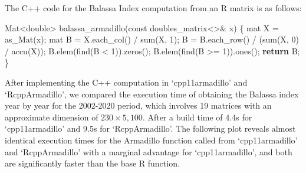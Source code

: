 \documentclass[
  10pt,
  letterpaper,
]{article}
\newenvironment{Shaded}{\begin{snugshade}}{\end{snugshade}}
\newcommand{\AttributeTok}[1]{\textcolor[rgb]{0.40,0.45,0.13}{#1}}
\newcommand{\ControlFlowTok}[1]{\textcolor[rgb]{0.00,0.23,0.31}{\textbf{#1}}}
\newcommand{\DataTypeTok}[1]{\textcolor[rgb]{0.68,0.00,0.00}{#1}}
\newcommand{\DecValTok}[1]{\textcolor[rgb]{0.68,0.00,0.00}{#1}}
\newcommand{\NormalTok}[1]{\textcolor[rgb]{0.00,0.23,0.31}{#1}}
\newcommand{\OperatorTok}[1]{\textcolor[rgb]{0.37,0.37,0.37}{#1}}
\begin{document}
The C++ code for the Balassa Index computation from an R matrix is as
follows:

\begin{Shaded}
\begin{Highlighting}[]
\NormalTok{Mat}\OperatorTok{\textless{}}\DataTypeTok{double}\OperatorTok{\textgreater{}}\NormalTok{ balassa\_armadillo}\OperatorTok{(}\AttributeTok{const}\NormalTok{ doubles\_matrix}\OperatorTok{\textless{}\textgreater{}\&}\NormalTok{ x}\OperatorTok{)} \OperatorTok{\{}
\NormalTok{  mat X }\OperatorTok{=}\NormalTok{ as\_Mat}\OperatorTok{(}\NormalTok{x}\OperatorTok{);}
\NormalTok{  mat B }\OperatorTok{=}\NormalTok{ X}\OperatorTok{.}\NormalTok{each\_col}\OperatorTok{()} \OperatorTok{/}\NormalTok{ sum}\OperatorTok{(}\NormalTok{X}\OperatorTok{,} \DecValTok{1}\OperatorTok{);}
\NormalTok{  B }\OperatorTok{=}\NormalTok{ B}\OperatorTok{.}\NormalTok{each\_row}\OperatorTok{()} \OperatorTok{/} \OperatorTok{(}\NormalTok{sum}\OperatorTok{(}\NormalTok{X}\OperatorTok{,} \DecValTok{0}\OperatorTok{)} \OperatorTok{/}\NormalTok{ accu}\OperatorTok{(}\NormalTok{X}\OperatorTok{));}
\NormalTok{  B}\OperatorTok{.}\NormalTok{elem}\OperatorTok{(}\NormalTok{find}\OperatorTok{(}\NormalTok{B }\OperatorTok{\textless{}} \DecValTok{1}\OperatorTok{)).}\NormalTok{zeros}\OperatorTok{();}
\NormalTok{  B}\OperatorTok{.}\NormalTok{elem}\OperatorTok{(}\NormalTok{find}\OperatorTok{(}\NormalTok{B }\OperatorTok{\textgreater{}=} \DecValTok{1}\OperatorTok{)).}\NormalTok{ones}\OperatorTok{();}
  \ControlFlowTok{return}\NormalTok{ B}\OperatorTok{;}
\OperatorTok{\}}
\end{Highlighting}
\end{Shaded}

After implementing the C++ computation in `cpp11armadillo' and
`RcppArmadillo', we compared the execution time of obtaining the Balassa
index year by year for the 2002-2020 period, which involves 19 matrices
with an approximate dimension of \(230 \times 5,100\). After a build
time of 4.4s for `cpp11armadillo' and 9.5s for `RcppArmadillo'. The
following plot reveals almost identical execution times for the
Armadillo function called from `cpp11armadillo' and `RcppArmadillo' with
a marginal advantage for `cpp11armadillo', and both are significantly
faster than the base R function.
\end{document}

